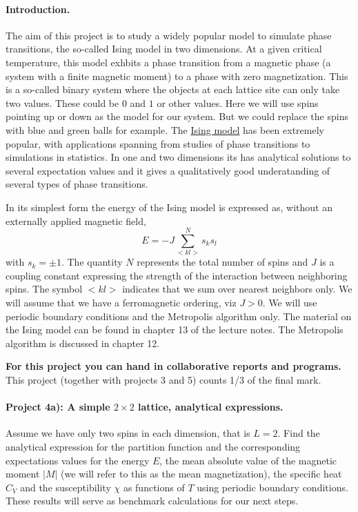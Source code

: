 \documentclass[%
oneside,                 %
final,                   %
10pt]{article}
\begin{document}
\paragraph{Introduction.}
The aim of this project is to study a widely popular model to simulate phase transitions, the so-called Ising model in two dimensions. At a given critical temperature, this model exhbits a phase transition from a magnetic phase (a system with a finite magnetic moment) to a phase with zero magnetization.
This is a so-called binary system where the objects at each lattice site can only take two values. These could be $0$ and $1$ or other values. Here we will use spins pointing up or down as the model for our system. But we could replace the spins with blue and green balls for example.
The \href{{https://en.wikipedia.org/wiki/Ising_model}}{Ising model} has been extremely popular, with applications spanning from studies of phase transitions to simulations in statistics. In one and two dimensions its has analytical solutions to several expectation values and it gives a qualitatively  good underatanding of several types of phase transitions.  

In its simplest form
the energy of the Ising model is expressed as, without an externally applied magnetic field, 
\[
E=-J\sum_{< kl >}^{N}s_ks_l 
\]
with
$s_k=\pm 1$. The quantity $N$ represents the total number of spins and $J$ is a coupling
constant expressing the strength of the interaction between
neighboring spins.  The symbol $<kl>$ indicates that we sum over
nearest neighbors only. We will assume that we have a ferromagnetic
ordering, viz $J> 0$.  We will use periodic boundary conditions and
the Metropolis algorithm only. The material on the Ising model can be found in chapter 13 of the lecture notes. The Metropolis algorithm is discussed in chapter 12. 

\textbf{For this project you can hand in collaborative reports and programs.}
This project (together with projects 3 and 5) counts 1/3 of the final mark.

\paragraph{Project 4a): A simple $2\times 2$ lattice, analytical expressions.}
Assume we have only two spins in each dimension, that is $L=2$.
Find the analytical expression 
for the partition function and the corresponding
expectations values for the energy $E$, the mean absolute value of the magnetic moment $\vert M\vert$ (we will refer to this as the mean magnetization), 
the specific heat $C_V$ and the susceptibility $\chi$ 
as functions of  $T$ using periodic boundary conditions. These results will serve as benchmark calculations for our next steps.
\end{document}
